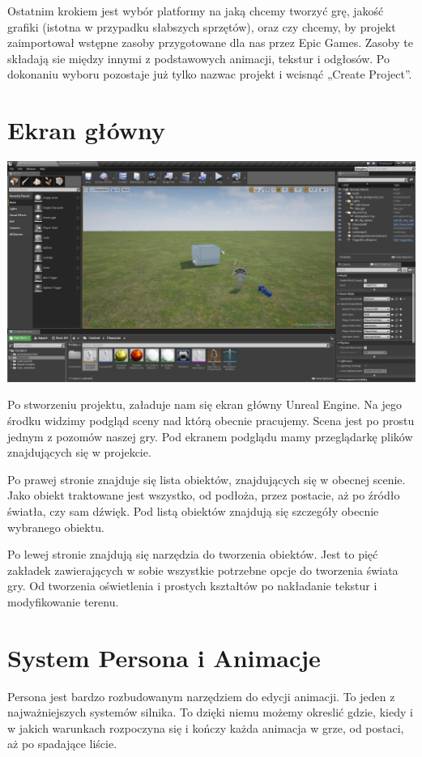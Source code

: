 \documentclass[brudnopis]{xmgr}
\begin{document}
Ostatnim krokiem jest wybór platformy na jaką chcemy tworzyć grę, jakość grafiki (istotna w przypadku słabszych sprzętów), oraz czy chcemy, by projekt zaimportował wstępne zasoby przygotowane dla nas przez Epic Games. Zasoby te składają sie między innymi z podstawowych animacji, tekstur i odgłosów.
Po dokonaniu wyboru pozostaje już tylko nazwac projekt i wcisnąć „Create Project”.

\section{Ekran główny}

\includegraphics[scale=0.25]{Screeny/Main}

Po stworzeniu projektu, załaduje nam się ekran główny Unreal Engine. Na jego środku widzimy podgląd sceny nad którą obecnie pracujemy. Scena jest po prostu jednym z pozomów naszej gry.
Pod ekranem podglądu mamy przeglądarkę plików znajdujących się w projekcie. 

Po prawej stronie znajduje się lista obiektów, znajdujących się w obecnej scenie. Jako obiekt traktowane jest wszystko, od podłoża, przez postacie, aż po źródło światła, czy sam dźwięk.
Pod listą obiektów znajdują się szczegóły obecnie wybranego obiektu. 

Po lewej stronie znajdują się narzędzia do tworzenia obiektów. Jest to pięć zakładek zawierających w sobie wszystkie potrzebne opcje do tworzenia świata gry. Od tworzenia oświetlenia i prostych kształtów po nakładanie tekstur i modyfikowanie terenu.
 
\section{System Persona i Animacje}
Persona jest bardzo rozbudowanym narzędziem do edycji animacji. To jeden z najważniejszych systemów silnika. To dzięki niemu możemy okreslić gdzie, kiedy i w jakich warunkach  rozpoczyna się i kończy każda animacja w grze, od postaci, aż po spadające liście.
\end{document}
